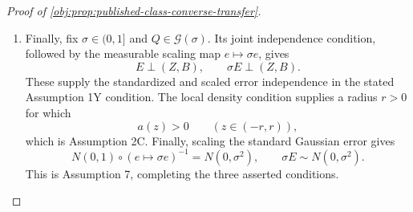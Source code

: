\documentclass[11pt]{article}
\begin{document}
\begin{proof}[Proof of \cref{obj:prop:published-class-converse-transfer}]
\begin{enumerate}
Now let \(I=[\ell,\upsilon]\) be any interval procedure honest on \(\mathcal G(\sigma)\). For every benchmark law \(P\), its embedded law \(Q\) satisfies
\[
\mathbb P_{P,n}\{\theta(P)\in I\}
=
Q\{\vartheta(Q)\in I\}
\ge0.9.
\]
Thus \(I\) belongs to the benchmark honest interval class of \cref{obj:def:honest-class}. Moreover,
\[
\mathcal L_\beta(n,\sigma)
\le
\sup_{P\in\mathcal M_\beta(\sigma)}
\mathbb E_{P,n}[\upsilon-\ell]
\le
\sup_{Q\in\mathcal G(\sigma)}
\mathbb E_Q[\upsilon-\ell].
\]
The second inequality follows from experiment preservation. Taking the infimum over intervals honest on \(\mathcal G(\sigma)\) proves the extended minimax comparison; the finite bound \(2\) permits its conversion to real values. Therefore
\[
\mathcal L_\beta(n,\sigma)\le\mathcal L_{\mathcal G}(n,\sigma).
\]
Combining these comparisons with the lower bounds already obtained yields
\[
c\,r_\beta(n,\sigma)
\le R_\beta(n,\sigma)
\le\mathcal R_{\mathcal G}(n,\sigma),
\qquad
c\,r_\beta(n,\sigma)
\le\mathcal L_\beta(n,\sigma)
\le\mathcal L_{\mathcal G}(n,\sigma).
\]

\item Finally, fix \(\sigma\in(0,1]\) and \(Q\in\mathcal G(\sigma)\). Its joint independence condition, followed by the measurable scaling map \(e\mapsto\sigma e\), gives
\[
E\perp(Z,B),
\qquad
\sigma E\perp(Z,B).
\]
These supply the standardized and scaled error independence in the stated Assumption 1Y condition. The local density condition supplies a radius \(r>0\) for which
\[
a(z)>0\qquad(z\in(-r,r)),
\]
which is Assumption 2C. Finally, scaling the standard Gaussian error gives
\[
N(0,1)\circ(e\mapsto\sigma e)^{-1}=N(0,\sigma^2),
\qquad
\sigma E\sim N(0,\sigma^2).
\]
This is Assumption 7, completing the three asserted conditions.
\end{enumerate}
\end{proof}
\end{document}
